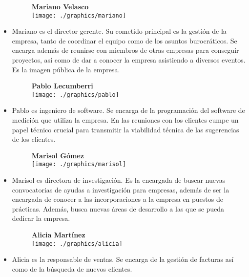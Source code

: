 		
		\begin{itemize}
			
			\begin{figure}[H]
				\centering
				{\large \textbf{Mariano Velasco}\\}\smallskip
				\texttt{[image: ./graphics/mariano]}	
			\end{figure}			
			\item Mariano es el director gerente. Su cometido principal es la gestión de la empresa, tanto de coordinar el equipo como de los asuntos burocráticos. Se encarga además de reunirse con miembros de otras empresas para conseguir proyectos, así como de dar a conocer la empresa asistiendo a diversos eventos. Es la imagen pública de la empresa.  \\
			\bigskip
			
			
			\begin{figure}[H]
				\centering
				{\large \textbf{Pablo Lecumberri}\\}\smallskip
				\texttt{[image: ./graphics/pablo]}	
			\end{figure}
			
			\item Pablo es ingeniero de software. Se encarga de la programación del software de medición que utiliza la empresa. En las reuniones con los clientes cumpe un papel técnico crucial para transmitir la viabilidad técnica de las sugerencias de los clientes. \\
			\bigskip
			
			
			
			\begin{figure}[H]
				\centering
				{\large \textbf{Marisol Gómez}\\}\smallskip
				\texttt{[image: ./graphics/marisol]}	
			\end{figure}
			\item Marisol es directora de investigación. Es la encargada de buscar nuevas convocatorias de ayudas a investigación para empresas, además de ser la encargada de conocer a las incorporaciones a la empresa en puestos de prácticas. Además, busca nuevas áreas de desarrollo a las que se pueda dedicar la empresa. \\ 
			\bigskip
			
			\begin{figure}[H]
				\centering
				{\large \textbf{Alicia Martínez}\\}\smallskip
				\texttt{[image: ./graphics/alicia]}	
			\end{figure}
			\item Alicia es la responsable de ventas. Se encarga de la gestión de facturas así como de la búsqueda de nuevos clientes. \\
			\bigskip
			

\end{itemize}
